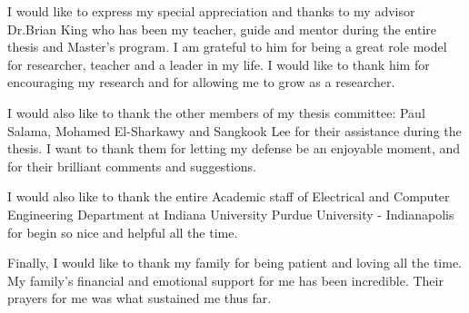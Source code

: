 
%
%
%
%
%


\begin{acknowledgments}
  I would like to express my special appreciation and thanks to my advisor Dr.Brian King who has been my teacher, guide and mentor during the entire thesis and Master's program.
  I am grateful to him for being a great role model for researcher, teacher and a leader in my life.
  I would like to thank him for encouraging my research and for allowing me to grow as a researcher.

  I would also like to thank the other members of my thesis committee: Paul Salama, Mohamed El-Sharkawy and Sangkook Lee for their assistance during the thesis.
  I want to thank them for letting my defense be an enjoyable moment, and for their brilliant comments and suggestions. 

  I would also like to thank the entire Academic staff of Electrical and Computer Engineering Department at Indiana University Purdue University - Indianapolis for begin so nice and helpful all the time. 

  Finally, I would like to thank my family for being patient and loving all the time.
  My family's financial and emotional support for me has been incredible.
  Their prayers for me was what sustained me thus far.    

\end{acknowledgments}

